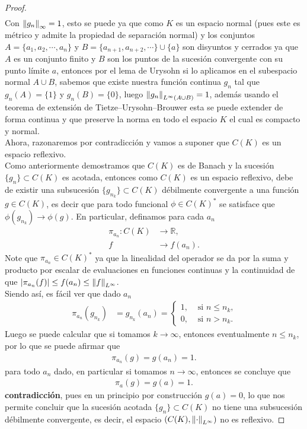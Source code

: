 \begin{proof}
\begin{align*}
  \end{align*}
  Con $\left\|g_{n}\right\|_{\infty}=1$, esto se puede ya que como $K$ es un espacio normal (pues este es métrico y admite la propiedad de separación normal) y los conjuntos $A=\{a_{1},a_{2},\cdots,a_{n}\}$ y $B=\{a_{n+1},a_{n+2},\cdots\}\cup \{a\}$ son disyuntos y cerrados ya que $A$ es un conjunto finito y $B$ son los puntos de la sucesión convergente con su punto límite $a$, entonces por el lema de Urysohn si lo aplicamos en el subespacio normal $A\cup B$, sabemos que existe nuestra función continua $g_{n}$ tal que $g_{n}(A)=\{1\}$ y $g_{n}(B)=\{0\}$, luego $\left\|g_{n}\right\|_{L^{\infty}(A\cup B)}=1$, además usando el teorema de extensión de Tietze–Urysohn–Brouwer esta se puede extender de forma continua y que preserve la norma en todo el espacio $K$ el cual es compacto y normal.\\
  Ahora, razonaremos por contradicción y vamos a suponer que $C(K)$ es un espacio reflexivo.\\
  Como anteriormente demostramos que $C(K)$ es de Banach y la sucesión $\{g_{n}\}\subset C(K)$ es acotada, entonces como $C(K)$ es un espacio reflexivo, debe de existir una subsucesión $\{g_{n_{k}}\}\subset C(K)$ débilmente convergente a una función $g\in C(K)$, es decir que para todo funcional $\phi\in C(K)^{*}$ se satisface que $\phi(g_{n_{k}})\to\phi(g)$. En particular, definamos para cada $a_{n}$
  \begin{align*}
    \pi_{a_{n}}:C(K)&\to \mathbb{R},\\
    f&\to f(a_{n}).
  \end{align*}
  Note que $\pi_{a_{n}}\in C(K)^{*}$ ya que la linealidad del operador se da por la suma y producto por escalar de evaluaciones en funciones continuas y la continuidad de que $|\pi_{a_{n}}(f)|\leq f(a_{n})\leq \left\|f\right\|_{L^{\infty}}$.\\
  Siendo así, es fácil ver que dado $a_{n}$
  \begin{align*}
    \pi_{a_{n}}(g_{n_{k}})&=g_{n_{k}}(a_{n})= 
    \begin{cases}
      1, &\text{ si } n\leq n_{k} \text{,} \\
      0, &\text{ si } n>n_{k}.
    \end{cases}
  \end{align*}
  Luego se puede calcular que si tomamos $k\to \infty$, entonces eventualmente $n\leq n_{k}$, por lo que se puede afirmar que
  \begin{align*}
    \pi_{a_{n}}(g)=g(a_{n})=1. 
  \end{align*}
  para todo $a_{n}$ dado, en particular si tomamos $n\to\infty$, entonces se concluye que
  \begin{align*}
    \pi_{a}(g)=g(a)=1.
  \end{align*}
  \textbf{contradicción}, pues en un principio por construcción $g(a)=0$, lo que nos permite concluir que la sucesión acotada $\{g_{n}\}\subset C(K)$ no tiene una subsucesión débilmente convergente, es decir, el espacio $(C(K),\left\|\cdot\right\|_{L^{\infty}})$ no es reflexivo. 
\end{proof}

